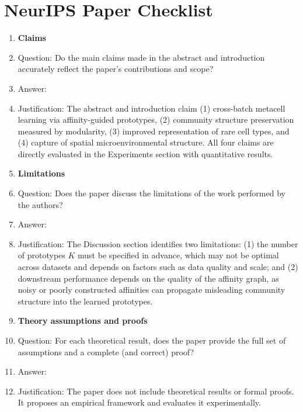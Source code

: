 \section*{NeurIPS Paper Checklist}

\begin{enumerate}

\item {\bf Claims}
    \item[] Question: Do the main claims made in the abstract and introduction accurately reflect the paper's contributions and scope?
    \item[] Answer: \answerYes{}
    \item[] Justification: The abstract and introduction claim (1) cross-batch metacell learning via affinity-guided prototypes, (2) community structure preservation measured by modularity, (3) improved representation of rare cell types, and (4) capture of spatial microenvironmental structure. All four claims are directly evaluated in the Experiments section with quantitative results.

\item {\bf Limitations}
    \item[] Question: Does the paper discuss the limitations of the work performed by the authors?
    \item[] Answer: \answerYes{}
    \item[] Justification: The Discussion section identifies two limitations: (1) the number of prototypes $K$ must be specified in advance, which may not be optimal across datasets and depends on factors such as data quality and scale; and (2) downstream performance depends on the quality of the affinity graph, as noisy or poorly constructed affinities can propagate misleading community structure into the learned prototypes.

\item {\bf Theory assumptions and proofs}
    \item[] Question: For each theoretical result, does the paper provide the full set of assumptions and a complete (and correct) proof?
    \item[] Answer: \answerNA{}
    \item[] Justification: The paper does not include theoretical results or formal proofs. It proposes an empirical framework and evaluates it experimentally.


\end{enumerate}
